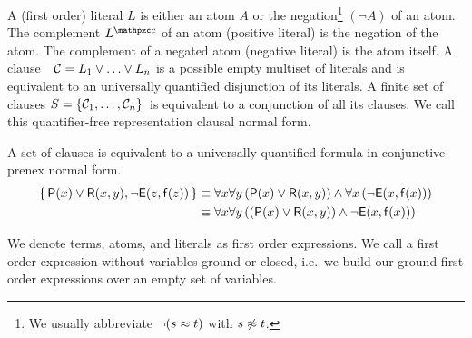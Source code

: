 
\begin{definition}[\CNF]\label{def:literals}\label{def:syntax:CNF}
A (first order) {\myem literal} $L$ is either an atom $A$ or the negation\footnote{
	We usually abbreviate $\lnot(s\approx t)$ with $s\not\approx t$.
} 
$(\lnot A)$ of an atom.
%
The {\myem complement} $L^\mcc$ of an atom (positive literal) is the negation of the atom.
The complement of a negated atom (negative literal) is the atom itself. 
%
A {\myem clause}\ \ ${\mathcal C} = L_1\lor\ldots\lor L_n$  is a possible empty multiset of literals 
and is equivalent to an universally quantified disjunction of its literals.
%
A finite {\myem set of clauses} $S=\{ {\mathcal C}_1,\ldots,{\mathcal C}_n \}$ is equivalent to a conjunction of all its clauses.
%
We call this quantifier-free representation {\myem clausal normal form}.
\end{definition}

\begin{example}A set of clauses is equivalent to a universally quantified formula in conjunctive prenex normal form.
	\begin{align*}
		\{\, {\mathsf P}(x)\lor{\mathsf R}(x,y), \lnot {\mathsf{E}}(z,{\mathsf f}(z)) \, \}
		&\equiv
		\forall x \forall y\, ({\mathsf P}(x)\lor{\mathsf R}(x,y))
		\land \forall x\, (\lnot {\mathsf{E}}(x,{\mathsf f}(x))) 
		\\
		&\equiv
		\forall x \forall y\left( 
		({\mathsf P}(x)\lor{\mathsf R}(x,y))
		\land \lnot {\mathsf{E}}(x,{\mathsf f}(x))
		\right)
	\end{align*}
\end{example}

\begin{definition}
	We denote
	terms, atoms, and literals as first order expressions.
	We call a first order expression without variables {\myem ground} or {\myem closed}, 
	i.e.~we build our ground first order expressions over an empty set of variables.
\end{definition}

